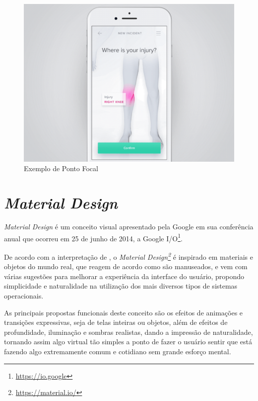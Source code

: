 \begin{enumerate}
\begin{itemize}
        \begin{figure}[htb]
        	\begin{center}
        	    \includegraphics[scale=0.35]{figs/ponto-foca.png}
        	\end{center}
        	\caption{\label{ponto focal}Exemplo de Ponto Focal}
        \end{figure}
    \end{itemize}
\end{enumerate}


\section{\textit{Material Design}}
\label{Material_Design}
\textit{Material Design} é um conceito visual apresentado pela Google em sua conferência anual que ocorreu em 25 de junho de 2014, a Google I/O\footnote{\url{https://io.google}}.

De acordo com a interpretação de \cite{rodrigues2017aplicaccao}, o \textit{Material Design\footnote{\url{https://material.io/}}} é inspirado em materiais e objetos do mundo real, que reagem de acordo como são manuseados, e vem com várias sugestões para melhorar a experiência da interface do usuário, propondo simplicidade e naturalidade na utilização dos mais diversos tipos de sistemas operacionais.

As principais propostas funcionais deste conceito são os efeitos de animações e transições expressivas, seja de telas inteiras ou objetos, além de efeitos de profundidade, iluminação e sombras realistas, dando a impressão de naturalidade, tornando assim algo virtual tão simples a ponto de fazer o usuário sentir que está fazendo algo extremamente comum e cotidiano sem grande esforço mental.

